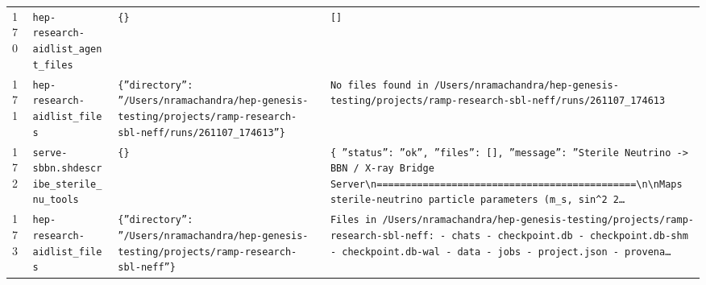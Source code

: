 \documentclass[11pt,a4paper]{article}
\begin{document}
\begin{longtable}{@{}p{}p{}p{}p{}@{}}
170 & \texttt{hep-research-aid}\newline\texttt{list\_\allowbreak{}agent\_\allowbreak{}files} & \texttt{\{\}\allowbreak{}} & \texttt{[]\allowbreak{}} \\
171 & \texttt{hep-research-aid}\newline\texttt{list\_\allowbreak{}files} & \texttt{\{''directory'':\allowbreak{} ''/\allowbreak{}Users/\allowbreak{}nramachandra/\allowbreak{}hep-genesis-testing/\allowbreak{}projects/\allowbreak{}ramp-research-sbl-neff/\allowbreak{}runs/\allowbreak{}261107\_\allowbreak{}174613''\}\allowbreak{}} & \texttt{No files found in /\allowbreak{}Users/\allowbreak{}nramachandra/\allowbreak{}hep-genesis-testing/\allowbreak{}projects/\allowbreak{}ramp-research-sbl-neff/\allowbreak{}runs/\allowbreak{}261107\_\allowbreak{}174613} \\
172 & \texttt{serve-sbbn.sh}\newline\texttt{describe\_\allowbreak{}sterile\_\allowbreak{}nu\_\allowbreak{}tools} & \texttt{\{\}\allowbreak{}} & \texttt{\{   ''status'':\allowbreak{} ''ok'',\allowbreak{}   ''files'':\allowbreak{} []\allowbreak{},\allowbreak{}   ''message'':\allowbreak{} ''Sterile Neutrino -\textgreater{}\allowbreak{} BBN /\allowbreak{} X-ray Bridge Server\textbackslash{}\allowbreak{}n=\allowbreak{}=\allowbreak{}=\allowbreak{}=\allowbreak{}=\allowbreak{}=\allowbreak{}=\allowbreak{}=\allowbreak{}=\allowbreak{}=\allowbreak{}=\allowbreak{}=\allowbreak{}=\allowbreak{}=\allowbreak{}=\allowbreak{}=\allowbreak{}=\allowbreak{}=\allowbreak{}=\allowbreak{}=\allowbreak{}=\allowbreak{}=\allowbreak{}=\allowbreak{}=\allowbreak{}=\allowbreak{}=\allowbreak{}=\allowbreak{}=\allowbreak{}=\allowbreak{}=\allowbreak{}=\allowbreak{}=\allowbreak{}=\allowbreak{}=\allowbreak{}=\allowbreak{}=\allowbreak{}=\allowbreak{}=\allowbreak{}=\allowbreak{}=\allowbreak{}=\allowbreak{}=\allowbreak{}=\allowbreak{}=\allowbreak{}=\allowbreak{}\textbackslash{}\allowbreak{}n\textbackslash{}\allowbreak{}nMaps sterile-neutrino particle parameters (m\_\allowbreak{}s,\allowbreak{} sin\textasciicircum{}\allowbreak{}2 2\ldots{}\allowbreak{}} \\
173 & \texttt{hep-research-aid}\newline\texttt{list\_\allowbreak{}files} & \texttt{\{''directory'':\allowbreak{} ''/\allowbreak{}Users/\allowbreak{}nramachandra/\allowbreak{}hep-genesis-testing/\allowbreak{}projects/\allowbreak{}ramp-research-sbl-neff''\}\allowbreak{}} & \texttt{Files in /\allowbreak{}Users/\allowbreak{}nramachandra/\allowbreak{}hep-genesis-testing/\allowbreak{}projects/\allowbreak{}ramp-research-sbl-neff:\allowbreak{}   - chats   - checkpoint.db   - checkpoint.db-shm   - checkpoint.db-wal   - data   - jobs   - project.json   - provena\ldots{}\allowbreak{}} \\

\end{longtable}
\end{document}
